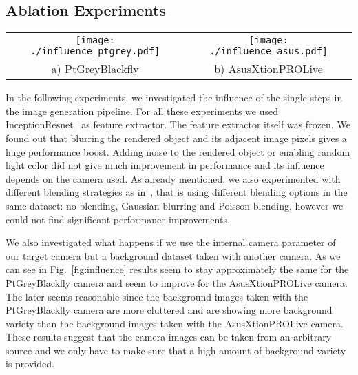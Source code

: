 \documentclass[10pt,twocolumn,letterpaper]{article}
\newcommand{\asus}[0]{AsusXtionPROLive\xspace}
\newcommand{\ptgrey}[0]{PtGreyBlackfly\xspace}
\begin{document}
\subsection{Ablation Experiments}
\label{sec:influence}

\begin{figure*}[ht]
\begin{center}
\begin{tabular}{cc}
\texttt{[image: ./influence\_ptgrey.pdf]} &
\texttt{[image: ./influence\_asus.pdf]} \\
a) \ptgrey &
b) \asus \\
\end{tabular}
\end{center}
\caption{\label{fig:influence} Influences  of the different building  blocks for
  synthetic  rendering for  the \ptgrey  and  the \asus  cameras.  Results  were
  obtained   with   InceptionResnet~\cite{inception_resnet}   as   the   feature
  extractor. Blurring is clearly a useful yet simple operation to apply to the
  synthetic images to improve the results.}
\end{figure*}

In the following experiments, we investigated  the influence of the single steps
in  the  image   generation  pipeline.   For  all  these   experiments  we  used
InceptionResnet~\cite{inception_resnet}  as  feature   extractor.   The  feature
extractor itself was frozen.  We found out that blurring the rendered object and
its adjacent image  pixels gives a huge performance boost.   Adding noise to the
rendered object or enabling random light  color did not give much improvement in
performance and its influence depends on the camera used.  As already mentioned,
we also experimented with  different blending strategies as in~\cite{Dwibedi17},
that  is using  different blending  options in  the same  dataset: no  blending,
Gaussian blurring  and Poisson blending,  however we could not  find significant
performance improvements.

We also investigated what happens if we use the internal camera parameter of our
target camera but a background dataset taken with another camera.  As we can see
in Fig.~\ref{fig:influence} results seem to  stay approximately the same for the
\ptgrey  camera and  seem  to improve  for  the \asus  camera.  The later  seems
reasonable since  the background images taken  with the \ptgrey camera  are more
cluttered and  are showing  more background variety  than the  background images
taken with the  \asus camera.  These results suggest that  the camera images can
be taken  from an arbitrary  source and we  only have to  make sure that  a high
amount of background variety is provided.
\end{document}
